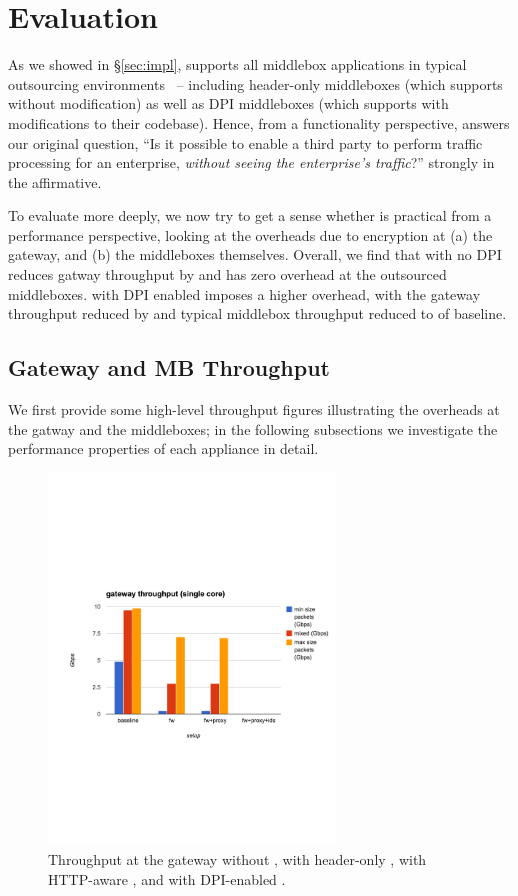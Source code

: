 
\section{Evaluation} \label{sec:eval}

As we showed in \S\ref{sec:impl}, \sys supports all middlebox applications in typical outsourcing environments~\cite{aplomb,nfv} -- including header-only middleboxes (which \sys supports without modification) as well as DPI middleboxes (which \sys supports with modifications to their codebase). 
Hence, from a functionality perspective, \sys answers our original question, ``Is it possible to enable a third party to perform traffic processing for an enterprise, {\em without seeing the enterprise's traffic}?''  strongly in the affirmative.

To evaluate \sys more deeply, we now try to get a sense whether \sys is practical from a performance perspective, looking at the overheads due to encryption at (a) the gateway, and (b) the middleboxes themselves. Overall, we find that \sys with no DPI reduces gatway throughput by  and has zero overhead at the outsourced middleboxes. \sys with DPI enabled imposes a higher overhead, with the gateway throughput reduced by  and typical middlebox throughput reduced to  of baseline. 


\subsection{Gateway and MB Throughput}
We first provide some high-level throughput figures illustrating the overheads at the gatway and the middleboxes; in the following subsections we investigate the performance properties of each appliance in detail.

\begin{figure}[t]
  \includegraphics[width=3in]{fig/gatewayxput}
  \caption[]{\label{fig:gwxput} Throughput at the gateway without \sys, with header-only \sys, with HTTP-aware \sys, and with DPI-enabled \sys.}
\end{figure}


